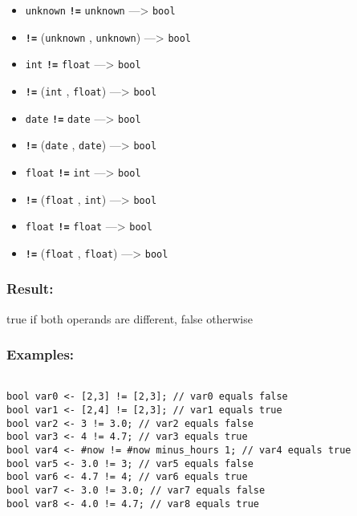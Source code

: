 \documentclass[]{book}
\providecommand{\tightlist}{%
  \setlength{\itemsep}{0pt}\setlength{\parskip}{0pt}}
\theoremstyle{definition}
\theoremstyle{definition}
\theoremstyle{definition}
\theoremstyle{remark}
\begin{document}
\begin{itemize}
\tightlist
\item
  \texttt{unknown} \textbf{\texttt{!=}} \texttt{unknown}
  ---\textgreater{} \texttt{bool}
\item
  \textbf{\texttt{!=}} (\texttt{unknown} , \texttt{unknown})
  ---\textgreater{} \texttt{bool}
\item
  \texttt{int} \textbf{\texttt{!=}} \texttt{float} ---\textgreater{}
  \texttt{bool}
\item
  \textbf{\texttt{!=}} (\texttt{int} , \texttt{float}) ---\textgreater{}
  \texttt{bool}
\item
  \texttt{date} \textbf{\texttt{!=}} \texttt{date} ---\textgreater{}
  \texttt{bool}
\item
  \textbf{\texttt{!=}} (\texttt{date} , \texttt{date}) ---\textgreater{}
  \texttt{bool}
\item
  \texttt{float} \textbf{\texttt{!=}} \texttt{int} ---\textgreater{}
  \texttt{bool}
\item
  \textbf{\texttt{!=}} (\texttt{float} , \texttt{int}) ---\textgreater{}
  \texttt{bool}
\item
  \texttt{float} \textbf{\texttt{!=}} \texttt{float} ---\textgreater{}
  \texttt{bool}
\item
  \textbf{\texttt{!=}} (\texttt{float} , \texttt{float})
  ---\textgreater{} \texttt{bool}
\end{itemize}

\subsubsection{Result:}\label{result-3}

true if both operands are different, false otherwise

\subsubsection{Examples:}\label{examples-2}

\begin{verbatim}
 
bool var0 <- [2,3] != [2,3]; // var0 equals false 
bool var1 <- [2,4] != [2,3]; // var1 equals true 
bool var2 <- 3 != 3.0; // var2 equals false 
bool var3 <- 4 != 4.7; // var3 equals true 
bool var4 <- #now != #now minus_hours 1; // var4 equals true 
bool var5 <- 3.0 != 3; // var5 equals false 
bool var6 <- 4.7 != 4; // var6 equals true 
bool var7 <- 3.0 != 3.0; // var7 equals false 
bool var8 <- 4.0 != 4.7; // var8 equals true
\end{verbatim}
\end{document}
